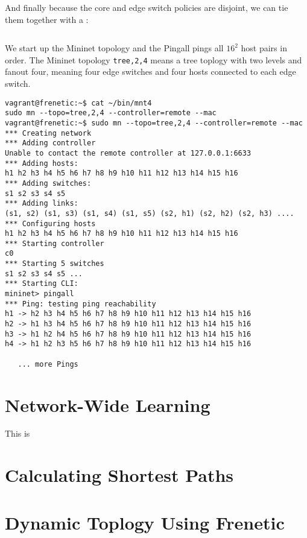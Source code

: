 \inputminted[firstline=42,lastline=51]{python}{code/multiswitch_topologies/multiswitch1.py}

And finally because the core and edge switch policies are disjoint, we can tie them together with a 
:

\inputminted[firstline=53,lastline=54]{python}{code/multiswitch_topologies/multiswitch1.py}

We start up the Mininet topology and the Pingall pings all $16^2$ host pairs in order.  The Mininet 
topology \texttt{tree,2,4} means a tree toplogy with two levels and fanout four, meaning four
edge switches and four hosts connected to each edge switch.   

\begin{verbatim}
vagrant@frenetic:~$ cat ~/bin/mnt4
sudo mn --topo=tree,2,4 --controller=remote --mac
vagrant@frenetic:~$ sudo mn --topo=tree,2,4 --controller=remote --mac
*** Creating network
*** Adding controller
Unable to contact the remote controller at 127.0.0.1:6633
*** Adding hosts:
h1 h2 h3 h4 h5 h6 h7 h8 h9 h10 h11 h12 h13 h14 h15 h16
*** Adding switches:
s1 s2 s3 s4 s5
*** Adding links:
(s1, s2) (s1, s3) (s1, s4) (s1, s5) (s2, h1) (s2, h2) (s2, h3) ....
*** Configuring hosts
h1 h2 h3 h4 h5 h6 h7 h8 h9 h10 h11 h12 h13 h14 h15 h16
*** Starting controller
c0
*** Starting 5 switches
s1 s2 s3 s4 s5 ...
*** Starting CLI:
mininet> pingall
*** Ping: testing ping reachability
h1 -> h2 h3 h4 h5 h6 h7 h8 h9 h10 h11 h12 h13 h14 h15 h16
h2 -> h1 h3 h4 h5 h6 h7 h8 h9 h10 h11 h12 h13 h14 h15 h16
h3 -> h1 h2 h4 h5 h6 h7 h8 h9 h10 h11 h12 h13 h14 h15 h16
h4 -> h1 h2 h3 h5 h6 h7 h8 h9 h10 h11 h12 h13 h14 h15 h16

   ... more Pings
\end{verbatim}

\section{Network-Wide Learning}

This is 

\section{Calculating Shortest Paths}

\section{Dynamic Toplogy Using Frenetic}


